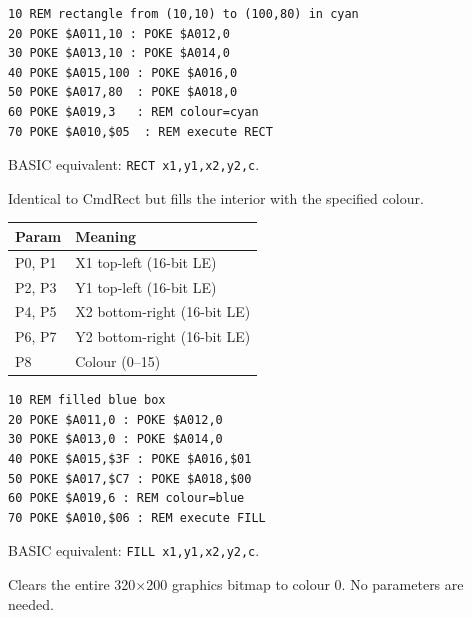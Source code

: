 \begin{lstlisting}
10 REM rectangle from (10,10) to (100,80) in cyan
20 POKE $A011,10 : POKE $A012,0
30 POKE $A013,10 : POKE $A014,0
40 POKE $A015,100 : POKE $A016,0
50 POKE $A017,80  : POKE $A018,0
60 POKE $A019,3   : REM colour=cyan
70 POKE $A010,$05  : REM execute RECT
\end{lstlisting}

\begin{notebox}
BASIC equivalent: \texttt{RECT x1,y1,x2,y2,c}.
\end{notebox}



Identical to CmdRect but fills the interior with the specified colour.

\begin{center}
\small
\begin{tabular}{@{}ll@{}}
\toprule
\textbf{Param} & \textbf{Meaning} \\
\midrule
P0, P1 & X1 top-left (16-bit LE) \\
P2, P3 & Y1 top-left (16-bit LE) \\
P4, P5 & X2 bottom-right (16-bit LE) \\
P6, P7 & Y2 bottom-right (16-bit LE) \\
P8     & Colour (0--15) \\
\bottomrule
\end{tabular}
\end{center}

\begin{lstlisting}
10 REM filled blue box
20 POKE $A011,0 : POKE $A012,0
30 POKE $A013,0 : POKE $A014,0
40 POKE $A015,$3F : POKE $A016,$01
50 POKE $A017,$C7 : POKE $A018,$00
60 POKE $A019,6 : REM colour=blue
70 POKE $A010,$06 : REM execute FILL
\end{lstlisting}

\begin{notebox}
BASIC equivalent: \texttt{FILL x1,y1,x2,y2,c}.
\end{notebox}



Clears the entire 320$\times$200 graphics bitmap to colour 0.  No parameters
are needed.

